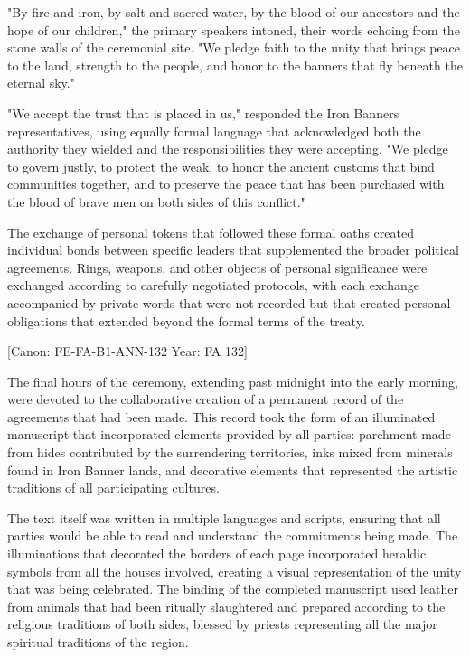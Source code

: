"By fire and iron, by salt and sacred water, by the blood of our
ancestors and the hope of our children," the primary speakers intoned,
their words echoing from the stone walls of the ceremonial site. "We
pledge faith to the unity that brings peace to the land, strength to the
people, and honor to the banners that fly beneath the eternal sky."

"We accept the trust that is placed in us," responded the Iron
Banner\textquotesingle s representatives, using equally formal language
that acknowledged both the authority they wielded and the
responsibilities they were accepting. "We pledge to govern justly, to
protect the weak, to honor the ancient customs that bind communities
together, and to preserve the peace that has been purchased with the
blood of brave men on both sides of this conflict."

The exchange of personal tokens that followed these formal oaths created
individual bonds between specific leaders that supplemented the broader
political agreements. Rings, weapons, and other objects of personal
significance were exchanged according to carefully negotiated protocols,
with each exchange accompanied by private words that were not recorded
but that created personal obligations that extended beyond the formal
terms of the treaty.

{[}Canon: FE-FA-B1-ANN-132 \textbar{} Year: FA 132{]}

The final hours of the ceremony, extending past midnight into the early
morning, were devoted to the collaborative creation of a permanent
record of the agreements that had been made. This record took the form
of an illuminated manuscript that incorporated elements provided by all
parties: parchment made from hides contributed by the surrendering
territories, inks mixed from minerals found in Iron Banner lands, and
decorative elements that represented the artistic traditions of all
participating cultures.

The text itself was written in multiple languages and scripts, ensuring
that all parties would be able to read and understand the commitments
being made. The illuminations that decorated the borders of each page
incorporated heraldic symbols from all the houses involved, creating a
visual representation of the unity that was being celebrated. The
binding of the completed manuscript used leather from animals that had
been ritually slaughtered and prepared according to the religious
traditions of both sides, blessed by priests representing all the major
spiritual traditions of the region.

